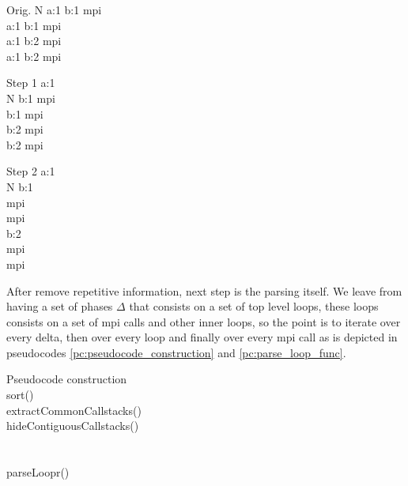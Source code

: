 \begin{multicols}{3}
\begin{pseudocode}{Orig.}{ }
  \label{pc:beautify_1}
    N \DO
  \BEGIN
    a:1 \rightarrow b:1 \rightarrow mpi \\
    a:1 \rightarrow b:1 \rightarrow mpi \\
    a:1 \rightarrow b:2 \rightarrow mpi \\
    a:1 \rightarrow b:2 \rightarrow mpi \\
  \END
\end{pseudocode}
\columnbreak
\begin{pseudocode}{Step 1}{ }
  \label{pc:beautify_2}
  a:1 \rightarrow \\
    N \DO
  \BEGIN
    b:1 \rightarrow mpi \\  
    b:1 \rightarrow mpi \\
    b:2 \rightarrow mpi \\
    b:2 \rightarrow mpi \\
  \END
\end{pseudocode}
\columnbreak
\begin{pseudocode}{Step 2}{ }
  \label{pc:beautify_3}
  a:1 \rightarrow \\
    N \DO
  \BEGIN
    b:1 \\
     \rightarrow mpi \\
     \rightarrow mpi \\
    b:2 \\
     \rightarrow mpi \\
     \rightarrow mpi \\
  \END
\end{pseudocode}
\end{multicols}

After remove repetitive information, next step is the parsing itself. We leave 
from having a set of phases $\Delta$ that
consists on a set of top level loops, these loops consists on a set of mpi calls 
and other inner loops, so the point is to iterate over every delta, then over 
every loop and finally over every mpi call as is depicted in pseudocodes 
\ref{pc:pseudocode_construction} and \ref{pc:parse_loop_func}.

\begin{pseudocode}{Pseudocode construction}{\Delta}
\label{pc:pseudocode_construction}
     \\
    \Delta \GETS sort(\Delta) \\
    \FORALL \delta \in \Delta \DO
    \BEGIN
        \FORALL \upsilon \in \delta \DO
        \BEGIN
          extractCommonCallstacks(\upsilon) \\
          hideContiguousCallstacks(\upsilon) \\
        \END
    \END \\
    \\
    \FORALL \delta \in \Delta \DO
    \BEGIN
        \FORALL \upsilon \in \delta \DO
        \BEGIN
            parseLoopr(\upsilon) \\
        \END
    \END
\end{pseudocode}

